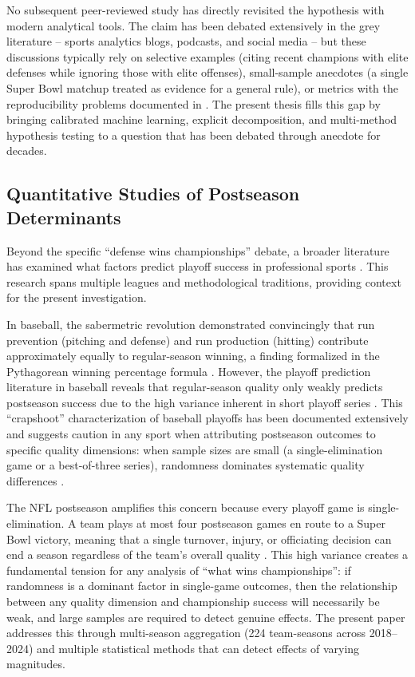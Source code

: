 No subsequent peer-reviewed study has directly revisited the hypothesis with modern analytical tools. The claim has been debated extensively in the grey literature  -- sports analytics blogs, podcasts, and social media  -- but these discussions typically rely on selective examples (citing recent champions with elite defenses while ignoring those with elite offenses), small-sample anecdotes (a single Super Bowl matchup treated as evidence for a general rule), or metrics with the reproducibility problems documented in . The present thesis fills this gap by bringing calibrated machine learning, explicit decomposition, and multi-method hypothesis testing to a question that has been debated through anecdote for decades.

\subsection{Quantitative Studies of Postseason Determinants}
\label{sec:postseason-determinants}

Beyond the specific ``defense wins championships'' debate, a broader literature has examined what factors predict playoff success in professional sports \parencite{baker2013assessing}. This research spans multiple leagues and methodological traditions, providing context for the present investigation.

In baseball, the sabermetric revolution demonstrated convincingly that run prevention (pitching and defense) and run production (hitting) contribute approximately equally to regular-season winning, a finding formalized in the Pythagorean winning percentage formula \parencite{miller2007pythagorean}. However, the playoff prediction literature in baseball reveals that regular-season quality only weakly predicts postseason success due to the high variance inherent in short playoff series \parencite{lopez2018randomness}. This ``crapshoot'' characterization of baseball playoffs has been documented extensively and suggests caution in any sport when attributing postseason outcomes to specific quality dimensions: when sample sizes are small (a single-elimination game or a best-of-three series), randomness dominates systematic quality differences \parencite{boulier2003predicting}.

The NFL postseason amplifies this concern because every playoff game is single-elimination. A team plays at most four postseason games en route to a Super Bowl victory, meaning that a single turnover, injury, or officiating decision can end a season regardless of the team's overall quality \parencite{lopez2018randomness}. This high variance creates a fundamental tension for any analysis of ``what wins championships'': if randomness is a dominant factor in single-game outcomes, then the relationship between any quality dimension and championship success will necessarily be weak, and large samples are required to detect genuine effects. The present paper addresses this through multi-season aggregation (224 team-seasons across 2018--2024) and multiple statistical methods that can detect effects of varying magnitudes.

